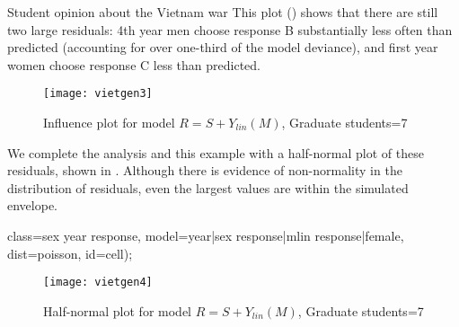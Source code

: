 \begin{Example}[vietnam3]{Student opinion about the Vietnam war}
This plot () shows that there are still two
large residuals: 4th year men choose response B substantially less often
than predicted (accounting for over one-third of the model deviance), and first year women choose response C less than
predicted.
\begin{figure}[htb]
  \centering
  \texttt{[image: vietgen3]}
  \caption{Influence plot for model $R = S + Y_{lin}(M)$, Graduate students=7}%
  \label{fig:vietgen3}
\end{figure}
We complete the analysis and this example with a half-normal plot of
these residuals, shown in .  Although there is
evidence of non-normality in the distribution of residuals,  even the largest
values are within the simulated envelope.
\begin{listing}
   class=sex year response,
   model=year|sex  response|mlin  response|female,
   dist=poisson, id=cell);
\end{listing}

\begin{figure}[htb]
  \centering
  \texttt{[image: vietgen4]}
  \caption{Half-normal plot for model $R = S + Y_{lin}(M)$, Graduate students=7}%
  \label{fig:vietgen4}
\end{figure}
\end{Example}

